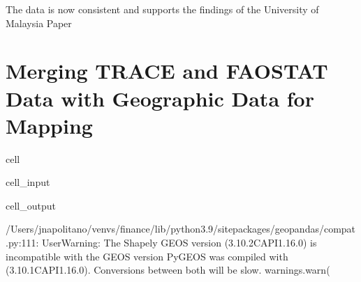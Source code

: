 \documentclass[letterpaper,10pt,english]{jupyterBook}
\begin{document}
\sphinxAtStartPar
The data is now consistent and supports the findings of the University of Malaysia Paper

\sphinxstepscope


\chapter{Merging TRACE and FAOSTAT Data with Geographic Data for Mapping}
\label{\detokenize{notebooks/geo_coding:merging-trace-and-faostat-data-with-geographic-data-for-mapping}}\label{\detokenize{notebooks/geo_coding::doc}}
\begin{sphinxuseclass}{cell}\begin{sphinxVerbatimInput}

\begin{sphinxuseclass}{cell_input}
\begin{sphinxVerbatim}[commandchars=\\\{\}]
   
   
   
 
   
     
   
   
   
   
\end{sphinxVerbatim}

\end{sphinxuseclass}\end{sphinxVerbatimInput}
\begin{sphinxVerbatimOutput}

\begin{sphinxuseclass}{cell_output}
\begin{sphinxVerbatim}[commandchars=\\\{\}]
/Users/jnapolitano/venvs/finance/lib/python3.9/site\PYGZhy{}packages/geopandas/\PYGZus{}compat.py:111: UserWarning: The Shapely GEOS version (3.10.2\PYGZhy{}CAPI\PYGZhy{}1.16.0) is incompatible with the GEOS version PyGEOS was compiled with (3.10.1\PYGZhy{}CAPI\PYGZhy{}1.16.0). Conversions between both will be slow.
  warnings.warn(
\end{sphinxVerbatim}

\end{sphinxuseclass}\end{sphinxVerbatimOutput}

\end{sphinxuseclass}
\end{document}
